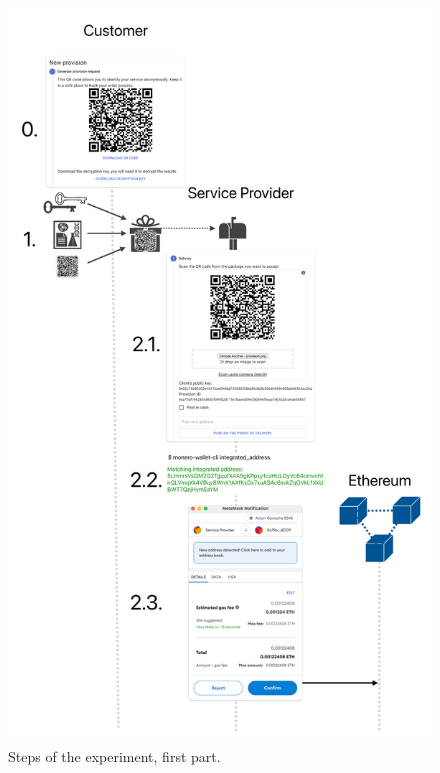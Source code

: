 \begin{figure}
  \centering
  \includegraphics[height=0.95\textheight,keepaspectratio]{anonser-experiment1.pdf}
  \caption{Steps of the experiment, first part.}\label{fig:anonser-experiment1}
\end{figure}

